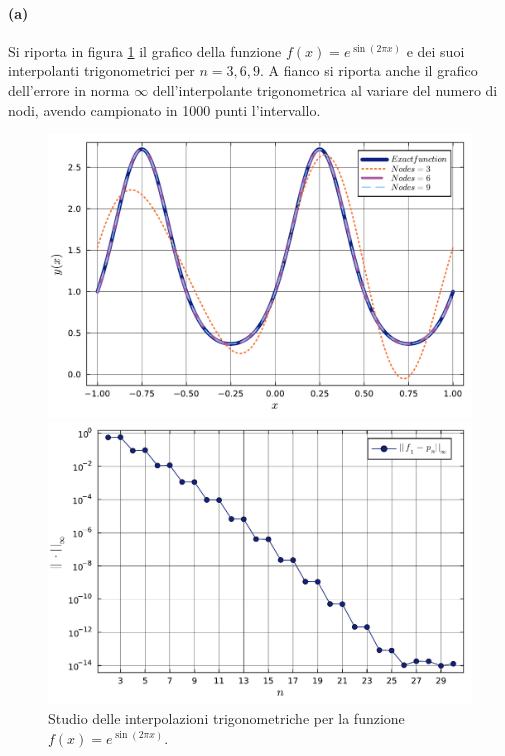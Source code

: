 \documentclass[letterpaper, 12pt]{article}
\begin{document}
\paragraph{(a) } Si riporta in figura \ref{fig:es4_6_1_1} il grafico della funzione $f(x) = e^{\sin (2\pi x)}$
e dei suoi interpolanti trigonometrici per $n=3,6,9$. A fianco si riporta anche il grafico 
dell'errore in norma $\infty$ dell'interpolante trigonometrica al variare del numero di nodi, avendo campionato 
in 1000 punti l'intervallo.
\begin{figure}[!ht]
    \centering
    \begin{minipage}[b]{0.47\textwidth}
        \includegraphics[width=\textwidth]{4611.pdf}
    \end{minipage}
    \hspace{0.5cm}
    \begin{minipage}[b]{0.47\textwidth}
        \includegraphics[width=\textwidth]{4612.pdf}
    \end{minipage}
    \caption{Studio delle interpolazioni trigonometriche per la funzione $f(x) = e^{\sin (2\pi x)}$.}
    \label{fig:es4_6_1_1}
\end{figure}
\end{document}
